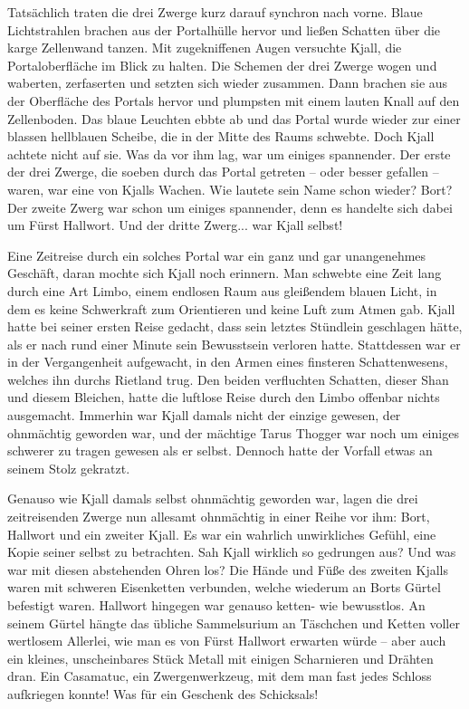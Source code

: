Tatsächlich traten die drei Zwerge kurz darauf synchron nach vorne. Blaue Lichtstrahlen brachen aus der Portalhülle hervor und ließen Schatten über die karge Zellenwand tanzen. Mit zugekniffenen Augen versuchte Kjall, die Portaloberfläche im Blick zu halten. Die Schemen der drei Zwerge wogen und waberten, zerfaserten und setzten sich wieder zusammen. Dann brachen sie aus der Oberfläche des Portals hervor und plumpsten mit einem lauten Knall auf den Zellenboden. Das blaue Leuchten ebbte ab und das Portal wurde wieder zur einer blassen hellblauen Scheibe, die in der Mitte des Raums schwebte. Doch Kjall achtete nicht auf sie. Was da vor ihm lag, war um einiges spannender. Der erste der drei Zwerge, die soeben durch das Portal getreten – oder besser gefallen – waren, war eine von Kjalls Wachen. Wie lautete sein Name schon wieder? Bort? Der zweite Zwerg war schon um einiges spannender, denn es handelte sich dabei um Fürst Hallwort. Und der dritte Zwerg... war Kjall selbst!\bigskip



Eine Zeitreise durch ein solches Portal war ein ganz und gar unangenehmes Geschäft, daran mochte sich Kjall noch erinnern. Man schwebte eine Zeit lang durch eine Art Limbo, einem endlosen Raum aus gleißendem blauen Licht, in dem es keine Schwerkraft zum Orientieren und keine Luft zum Atmen gab. Kjall hatte bei seiner ersten Reise gedacht, dass sein letztes Stündlein geschlagen hätte, als er nach rund einer Minute sein Bewusstsein verloren hatte. Stattdessen war er in der Vergangenheit aufgewacht, in den Armen eines finsteren Schattenwesens, welches ihn durchs Rietland trug. Den beiden verfluchten Schatten, dieser Shan und diesem Bleichen, hatte die luftlose Reise durch den Limbo offenbar nichts ausgemacht. Immerhin war Kjall damals nicht der einzige gewesen, der ohnmächtig geworden war, und der mächtige Tarus Thogger war noch um einiges schwerer zu tragen gewesen als er selbst. Dennoch hatte der Vorfall etwas an seinem Stolz gekratzt.

Genauso wie Kjall damals selbst ohnmächtig geworden war, lagen die drei zeitreisenden Zwerge nun allesamt ohnmächtig in einer Reihe vor ihm: Bort, Hallwort und ein zweiter Kjall. Es war ein wahrlich unwirkliches Gefühl, eine Kopie seiner selbst zu betrachten. Sah Kjall wirklich so gedrungen aus? Und was war mit diesen abstehenden Ohren los? Die Hände und Füße des zweiten Kjalls waren mit schweren Eisenketten verbunden, welche wiederum an Borts Gürtel befestigt waren. Hallwort hingegen war genauso ketten- wie bewusstlos. An seinem Gürtel hängte das übliche Sammelsurium an Täschchen und Ketten voller wertlosem Allerlei, wie man es von Fürst Hallwort erwarten würde – aber auch ein kleines, unscheinbares Stück Metall mit einigen Scharnieren und Drähten dran. Ein Casamatuc, ein Zwergenwerkzeug, mit dem man fast jedes Schloss aufkriegen konnte! Was für ein Geschenk des Schicksals!

